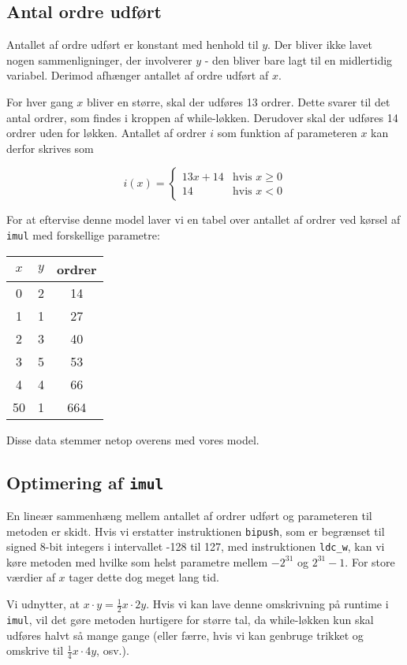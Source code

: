 \documentclass[12pt,a4paper]{article}
\newcommand{\imul}{\texttt{imul}}
\begin{document}
\subsection{Antal ordre udført}
Antallet af ordre udført er konstant med henhold til $y$. Der bliver ikke lavet
nogen sammenligninger, der involverer $y$ - den bliver bare lagt til en
midlertidig variabel. Derimod afhænger antallet af ordre udført af $x$.

For hver gang $x$ bliver en større, skal der udføres 13 ordrer. Dette
svarer til det antal ordrer, som findes i kroppen af while-løkken.
Derudover skal der udføres 14 ordrer uden for løkken.
Antallet af ordrer $i$ som funktion af parameteren $x$ kan derfor
skrives som

\[i(x)=\left\{\begin{array}{cc}
	13x + 14 & \text{hvis }x\geq0 \\
	14 & \text{hvis }x<0
\end{array}\right.\]


For at eftervise denne model laver vi en tabel over antallet af ordrer
ved kørsel af \imul{} med forskellige parametre:

\begin{tabular}{|c|c|c|}
\hline
$x$ & $y$ & ordrer \\ \hline
 0  & 2  &  14 \\ \hline
 1  & 1  &  27 \\ \hline
 2  & 3  &  40 \\ \hline
 3  & 5  &  53 \\ \hline
 4  & 4  &  66 \\ \hline
50  & 1  & 664 \\ \hline
\end{tabular}

Disse data stemmer netop overens med vores model.

\subsection{Optimering af \imul{}}

En lineær sammenhæng mellem antallet af ordrer udført og parameteren til
metoden er skidt. Hvis vi erstatter instruktionen \texttt{bipush}, som er
begrænset til signed 8-bit integers i intervallet -128 til 127, med
instruktionen \texttt{ldc\_w}, kan vi køre metoden med hvilke som helst
parametre mellem $-2^{31}$ og $2^{31}-1$. For store værdier af $x$ tager dette
dog meget lang tid.

Vi udnytter, at $x\cdot y=\frac 12x\cdot2y$. Hvis vi kan lave denne omskrivning
på runtime i \imul{}, vil det gøre metoden hurtigere for større tal, da
while-løkken kun skal udføres halvt så mange gange (eller færre, hvis vi kan
genbruge trikket og omskrive til $\frac14x\cdot4y$, osv.).
\end{document}
